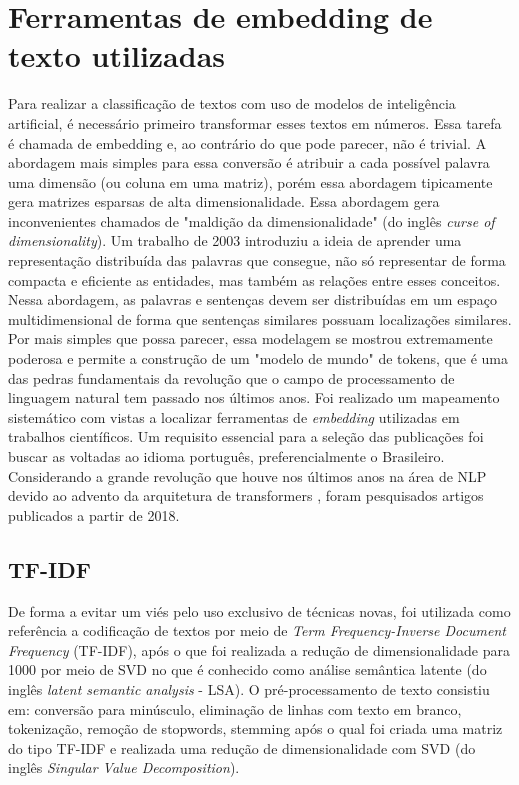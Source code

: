 \documentclass[conference]{IEEEtran}
\begin{document}
\section{Ferramentas de embedding de texto utilizadas}

  Para realizar a classificação de textos com uso de modelos de inteligência artificial, é necessário primeiro transformar esses textos em números. Essa tarefa é chamada de embedding e, ao contrário do que pode parecer, não é trivial. A abordagem mais simples para essa conversão é atribuir a cada possível palavra uma dimensão (ou coluna em uma matriz), porém essa abordagem tipicamente gera matrizes esparsas de alta dimensionalidade. Essa abordagem gera inconvenientes chamados de "maldição da dimensionalidade" (do inglês \textit{curse of dimensionality}). Um trabalho de 2003 \cite{bengio2003} introduziu a ideia de aprender uma representação distribuída das palavras que consegue, não só representar de forma compacta e eficiente as entidades, mas também as relações entre esses conceitos. Nessa abordagem, as palavras e sentenças devem ser distribuídas em um espaço multidimensional de forma que sentenças similares possuam localizações similares. Por mais simples que possa parecer, essa modelagem se mostrou extremamente poderosa e permite a construção de um "modelo de mundo" de tokens, que é uma das pedras fundamentais da revolução que o campo de processamento de linguagem natural tem passado nos últimos anos.
  Foi realizado um mapeamento sistemático com vistas a localizar ferramentas de \textit{embedding} utilizadas em trabalhos científicos. Um requisito essencial para a seleção das publicações foi buscar as voltadas ao idioma português, preferencialmente o Brasileiro. Considerando a grande revolução que houve nos últimos anos na área de NLP devido ao advento da arquitetura de transformers \cite{NIPS2017_3f5ee243}, foram pesquisados artigos publicados a partir de 2018.

\subsection{TF-IDF}

  De forma a evitar um viés pelo uso exclusivo de técnicas novas, foi utilizada como referência a codificação de textos por meio de \textit{Term Frequency-Inverse Document Frequency} (TF-IDF), após o que foi realizada a redução de dimensionalidade para 1000 por meio de SVD no que é conhecido como análise semântica latente (do inglês \textit{latent semantic analysis} - LSA).  O pré-processamento de texto consistiu em: conversão para minúsculo, eliminação de linhas com texto em branco, tokenização, remoção de stopwords, stemming após o qual foi criada uma matriz do tipo TF-IDF e realizada uma redução de dimensionalidade com SVD (do inglês \textit{Singular Value Decomposition}).
\end{document}
